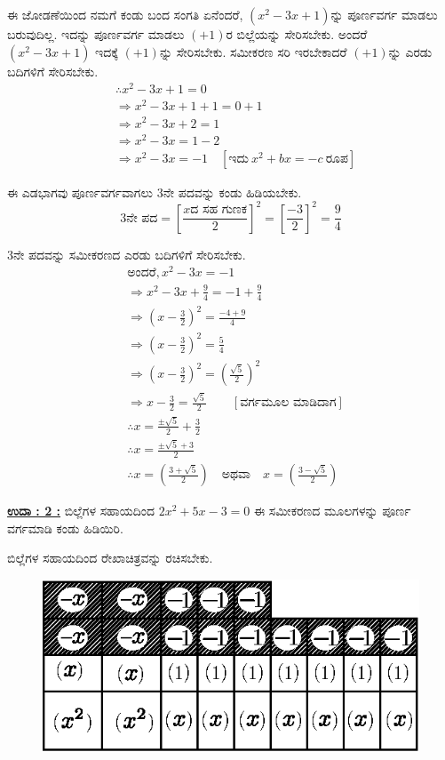 ಈ ಜೋಡಣೆಯಿಂದ ನಮಗೆ ಕಂಡು ಬಂದ ಸಂಗತಿ ಏನೆಂದರೆ, $(x^2 - 3x + 1)$ನ್ನು ಪೂರ್ಣವರ್ಗ ಮಾಡಲು ಬರುವುದಿಲ್ಲ. ಇದನ್ನು ಪೂರ್ಣವರ್ಗ ಮಾಡಲು $(+1)$ರ ಬಿಲ್ಲೆಯನ್ನು ಸೇರಿಸಬೇಕು. ಅಂದರೆ $(x^2 - 3x + 1)$ ಇದಕ್ಕೆ $(+1)$ನ್ನು ಸೇರಿಸಬೇಕು. ಸಮೀಕರಣ ಸರಿ ಇರಬೇಕಾದರೆ $(+1)$ನ್ನು ಎರಡು ಬದಿಗಳಿಗೆ ಸೇರಿಸಬೇಕು. 
\begin{align*}
& \therefore x^2 - 3x + 1 = 0\\
& \Rightarrow x^2 - 3x + 1 + 1 = 0 + 1\\
& \Rightarrow x^2 - 3x + 2 = 1\\
& \Rightarrow x^2 - 3x = 1 - 2\\
& \Rightarrow x^2 - 3x = -1 \quad [\text{ಇದು}~ x^2 + bx = -c ~\text{ರೂಪ}]
\end{align*}

ಈ ಎಡಭಾಗವು ಪೂರ್ಣವರ್ಗವಾಗಲು 3ನೇ ಪದವನ್ನು ಕಂಡು ಹಿಡಿಯಬೇಕು. 
$$
3\text{ನೇ ಪದ} = \left[\dfrac{x \text{ದ ಸಹ ಗುಣಕ}}{2} \right]^2 = \left[\dfrac{-3}{2}\right]^2 = \dfrac{9}{4}
$$

3ನೇ ಪದವನ್ನು ಸಮೀಕರಣದ ಎರಡು ಬದಿಗಳಿಗೆ ಸೇರಿಸಬೇಕು. 
\begin{align*}
& \text{ಅಂದರೆ}, x^2 - 3x = -1\\
& \Rightarrow x^2 - 3x + \frac{9}{4} = -1 + \frac{9}{4}\\
& \Rightarrow \left(x - \frac{3}{2} \right)^2 = \frac{-4 + 9}{4}\\
& \Rightarrow \left(x - \frac{3}{2} \right)^2 = \frac{5}{4}\\
& \Rightarrow \left(x - \frac{3}{2} \right)^2 = \left(\frac{\surd 5}{2}\right)^2\\
& \Rightarrow x - \frac{3}{2} = \frac{\surd 5}{2} \qquad [\text{ವರ್ಗಮೂಲ ಮಾಡಿದಾಗ}]\\
& \therefore x = \frac{\pm \surd 5}{2} + \frac{3}{2}\\
& \therefore x = \frac{\pm \surd 5 + 3}{2}\\
& \therefore x = \left(\frac{3 + \surd5}{2}\right) \quad\text{ಅಥವಾ}\quad x = \left(\frac{3 - \surd 5}{2}\right)
\end{align*}

\noindent
{\textbf{\underline{ಉದಾ : 2 :}}} ಬಿಲ್ಲೆಗಳ ಸಹಾಯದಿಂದ $2x^2 + 5x - 3 = 0$ ಈ ಸಮೀಕರಣದ ಮೂಲಗಳನ್ನು ಪೂರ್ಣ ವರ್ಗಮಾಡಿ ಕಂಡು ಹಿಡಿಯಿರಿ. 

ಬಿಲ್ಲೆಗಳ ಸಹಾಯದಿಂದ ರೇಖಾಚಿತ್ರವನ್ನು ರಚಿಸಬೇಕು.
\begin{figure}[H]
\centering
\includegraphics[scale=0.8]{src/figure/chap3/fig3-48.eps}
\end{figure}

